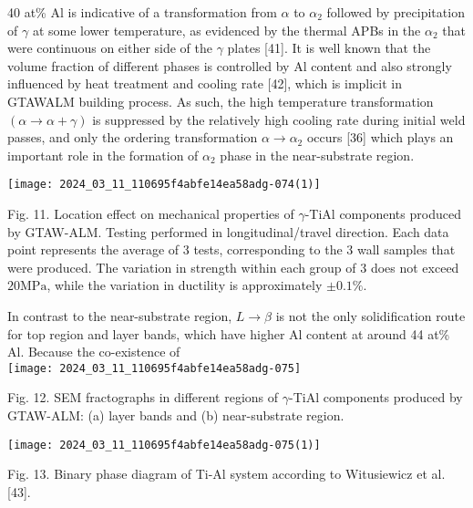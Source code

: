 \documentclass[10pt]{article}
\begin{document}
40 at\% $\mathrm{Al}$ is indicative of a transformation from $\alpha$ to $\alpha_{2}$ followed by precipitation of $\gamma$ at some lower temperature, as evidenced by the thermal APBs in the $\alpha_{2}$ that were continuous on either side of the $\gamma$ plates [41]. It is well known that the volume fraction of different phases is controlled by $\mathrm{Al}$ content and also strongly influenced by heat treatment and cooling rate [42], which is implicit in GTAWALM building process. As such, the high temperature transformation $(\alpha \rightarrow \alpha+\gamma)$ is suppressed by the relatively high cooling rate during initial weld passes, and only the ordering transformation $\alpha \rightarrow \alpha_{2}$ occurs [36] which plays an important role in the formation of $\alpha_{2}$ phase in the near-substrate region.

\begin{center}
\texttt{[image: 2024\_03\_11\_110695f4abfe14ea58adg-074(1)]}
\end{center}

Fig. 11. Location effect on mechanical properties of $\gamma$-TiAl components produced by GTAW-ALM. Testing performed in longitudinal/travel direction. Each data point represents the average of 3 tests, corresponding to the 3 wall samples that were produced. The variation in strength within each group of 3 does not exceed $20 \mathrm{MPa}$, while the variation in ductility is approximately $\pm 0.1 \%$.

In contrast to the near-substrate region, $L \rightarrow \beta$ is not the only solidification route for top region and layer bands, which have higher $\mathrm{Al}$ content at around 44 at\% Al. Because the co-existence of\\
\texttt{[image: 2024\_03\_11\_110695f4abfe14ea58adg-075]}

Fig. 12. SEM fractographs in different regions of $\gamma$-TiAl components produced by GTAW-ALM: (a) layer bands and (b) near-substrate region.

\begin{center}
\texttt{[image: 2024\_03\_11\_110695f4abfe14ea58adg-075(1)]}
\end{center}

Fig. 13. Binary phase diagram of Ti-Al system according to Witusiewicz et al. [43].
\end{document}
